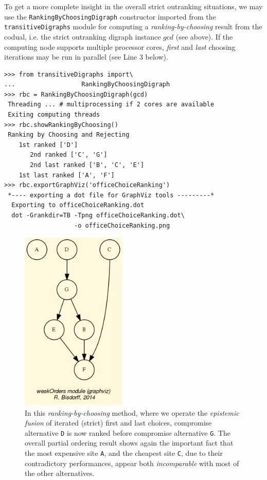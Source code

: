 To get a more complete insight in the overall strict outranking situations, we may use the \texttt{RankingByChoosingDigraph} constructor imported from the \texttt{transitiveDigraphs} module for computing a \emph{ranking-by-choosing} result from the codual, i.e. the strict outranking digraph instance $gcd$ (see above). If the computing node supports multiple processor cores, \emph{first} and \emph{last} choosing iterations may be run in parallel (see Line 3 below).
\begin{lstlisting}
>>> from transitiveDigraphs import\
...                  RankingByChoosingDigraph
>>> rbc = RankingByChoosingDigraph(gcd)
 Threading ... # multiprocessing if 2 cores are available
 Exiting computing threads
>>> rbc.showRankingByChoosing()
 Ranking by Choosing and Rejecting
    1st ranked ['D']
       2nd ranked ['C', 'G']
       2nd last ranked ['B', 'C', 'E']
    1st last ranked ['A', 'F']
>>> rbc.exportGraphViz('officeChoiceRanking')
 *---- exporting a dot file for GraphViz tools ---------*
  Exporting to officeChoiceRanking.dot
  dot -Grankdir=TB -Tpng officeChoiceRanking.dot\
                   -o officeChoiceRanking.png
\end{lstlisting}
\begin{figure}[h]
\sidecaption[t]
\includegraphics[width=5cm]{Figures/officeChoiceRanking.png}
\caption{In this \emph{ranking-by-choosing} method, where we operate the \emph{epistemic fusion} of iterated (strict) first and last choices, compromise alternative \texttt{D} is now ranked before compromise alternative \texttt{G}. The overall partial ordering result shows again the important fact that the most expensive site \texttt{A}, and the cheapest site \texttt{C}, due to their contradictory performances, appear both \emph{incomparable} with most of the other alternatives.} 
\label{fig:4.5}       %
\end{figure}
